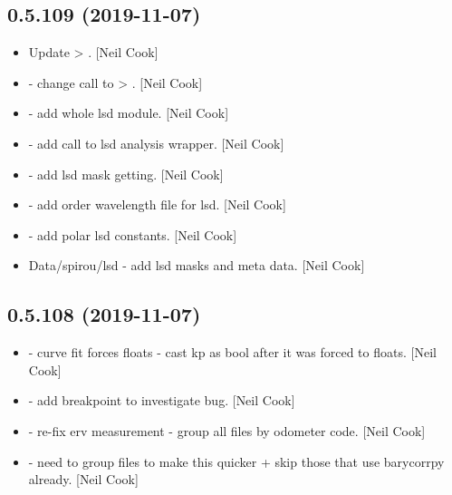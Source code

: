 \documentclass[a4paper,10pt,english]{report}
\begin{document}
\subsection{0.5.109 (2019-11-07)}
\label{\detokenize{misc/changelog:id34}}\begin{itemize}
\item {} 
Update  \textendash{}\textgreater{} . {[}Neil Cook{]}

\item {} 
 - change call to 
\textendash{}\textgreater{} . {[}Neil Cook{]}

\item {} 
 - add whole lsd module. {[}Neil Cook{]}

\item {} 
 - add call to lsd analysis wrapper.
{[}Neil Cook{]}

\item {} 
 - add lsd mask getting. {[}Neil Cook{]}

\item {} 
 - add order wavelength file for
lsd. {[}Neil Cook{]}

\item {} 
 - add polar lsd constants.
{[}Neil Cook{]}

\item {} 
Data/spirou/lsd - add lsd masks and meta data. {[}Neil Cook{]}

\end{itemize}


\subsection{0.5.108 (2019-11-07)}
\label{\detokenize{misc/changelog:id35}}\begin{itemize}
\item {} 
 - curve fit forces floats - cast kp as
bool after it was forced to floats. {[}Neil Cook{]}

\item {} 
 - add breakpoint to investigate bug. {[}Neil
Cook{]}

\item {} 
 - re-fix erv measurement - group all
files by odometer code. {[}Neil Cook{]}

\item {} 
 - need to group files to make this
quicker + skip those that use barycorrpy already. {[}Neil Cook{]}

\end{itemize}
\end{document}
